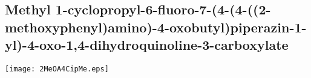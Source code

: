 \subsection{Methyl 1\hyp{}cyclopropyl\hyp{}6\hyp{}fluoro\hyp{}7\hyp{}(4\hyp{}(4\hyp{}((2\hyp{}methoxyphenyl)amino)\hyp{}4\hyp{}oxobutyl)\allowbreak piperazin\hyp{}1\hyp{}yl)\hyp{}4\hyp{}oxo\hyp{}1,4\hyp{}dihydroquinoline\hyp{}3\hyp{}carboxylate }


\begin{scheme}[H]
	\begin{center}
		\texttt{[image: 2MeOA4CipMe.eps]}
	\end{center}
\end{scheme}

